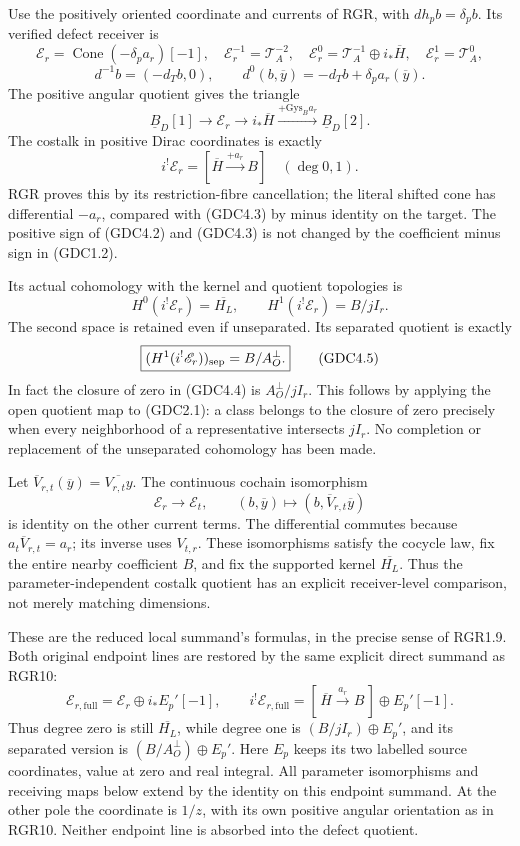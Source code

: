 Use the positively oriented coordinate and currents of RGR, with
\(dh_p b=\delta_pb\). Its verified defect receiver is \[
\mathscr E_r=\operatorname{Cone}(-\delta_pa_r)[-1],
\quad
\mathscr E_r^{-1}=\mathscr T_A^{-2},\quad
\mathscr E_r^0=\mathscr T_A^{-1}\oplus i_*\overline H,\quad
\mathscr E_r^1=\mathscr T_A^0,
\] \[
d^{-1}b=(-d_Tb,0),\qquad d^0(b,\overline y)=-d_Tb+\delta_pa_r(\overline y).
\tag{GDC4.1}
\] The positive angular quotient gives the triangle \[
\underline B_D[1]\to\mathscr E_r\to i_*\overline H
\xrightarrow{+\mathrm{Gys}_B a_r}\underline B_D[2].
\tag{GDC4.2}
\] The costalk in positive Dirac coordinates is exactly \[
i^!\mathscr E_r=[\overline H\xrightarrow{+a_r}B]\quad(\deg0,1).
\tag{GDC4.3}
\] RGR proves this by its restriction-fibre cancellation; the literal
shifted cone has differential \(-a_r\), compared with (GDC4.3) by minus
identity on the target. The positive sign of (GDC4.2) and (GDC4.3) is
not changed by the coefficient minus sign in (GDC1.2).

Its actual cohomology with the kernel and quotient topologies is \[
H^0(i^!\mathscr E_r)=\overline{H_L},\qquad
H^1(i^!\mathscr E_r)=B/jI_r.
\tag{GDC4.4}
\] The second space is retained even if unseparated. Its separated
quotient is exactly \[
\boxed{(H^1(i^!\mathscr E_r))_{\rm sep}=B/A_O^\perp.}
\tag{GDC4.5}
\] In fact the closure of zero in (GDC4.4) is \(A_O^\perp/jI_r\). This
follows by applying the open quotient map to (GDC2.1): a class belongs
to the closure of zero precisely when every neighborhood of a
representative intersects \(jI_r\). No completion or replacement of the
unseparated cohomology has been made.

Let \(\overline V_{r,t}(\overline y)=\overline{V_{r,t}y}\). The
continuous cochain isomorphism \[
\mathscr E_r\longrightarrow\mathscr E_t,
\qquad (b,\overline y)\longmapsto(b,\overline V_{r,t}\overline y)
\tag{GDC4.6}
\] is identity on the other current terms. The differential commutes
because \(a_t\overline V_{r,t}=a_r\); its inverse uses \(V_{t,r}\).
These isomorphisms satisfy the cocycle law, fix the entire nearby
coefficient \(B\), and fix the supported kernel \(\overline{H_L}\). Thus
the parameter-independent costalk quotient has an explicit
receiver-level comparison, not merely matching dimensions.

These are the reduced local summand's formulas, in the precise sense of
RGR1.9. Both original endpoint lines are restored by the same explicit
direct summand as RGR10: \[
\mathscr E_{r,\mathrm{full}}=\mathscr E_r\oplus i_*E_p'[-1],
\qquad
i^!\mathscr E_{r,\mathrm{full}}
=[\,\overline H\xrightarrow{a_r}B\,]\oplus E_p'[-1].
\tag{GDC4.7}
\] Thus degree zero is still \(\overline{H_L}\), while degree one is
\((B/jI_r)\oplus E_p'\), and its separated version is
\((B/A_O^\perp)\oplus E_p'\). Here \(E_p\) keeps its two labelled source
coordinates, value at zero and real integral. All parameter isomorphisms
and receiving maps below extend by the identity on this endpoint
summand. At the other pole the coordinate is \(1/z\), with its own
positive angular orientation as in RGR10. Neither endpoint line is
absorbed into the defect quotient.

